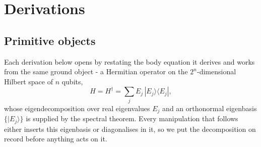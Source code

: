 \section{Derivations}\label{app:NA1}

\subsection*{Primitive objects}

Each derivation below opens by restating the body equation it derives and works from the same ground object - a Hermitian operator on the $2^n$-dimensional Hilbert space of $n$ qubits,
\begin{equation}\label{def:hamiltonian}
H = H^\dagger = \sum_j E_j \, |E_j\rangle\langle E_j| ,
\end{equation}
whose eigendecomposition over real eigenvalues $E_j$ and an orthonormal eigenbasis $\{|E_j\rangle\}$ is supplied by the spectral theorem. Every manipulation that follows either inserts this eigenbasis or diagonalises in it, so we put the decomposition on record before anything acts on it.

